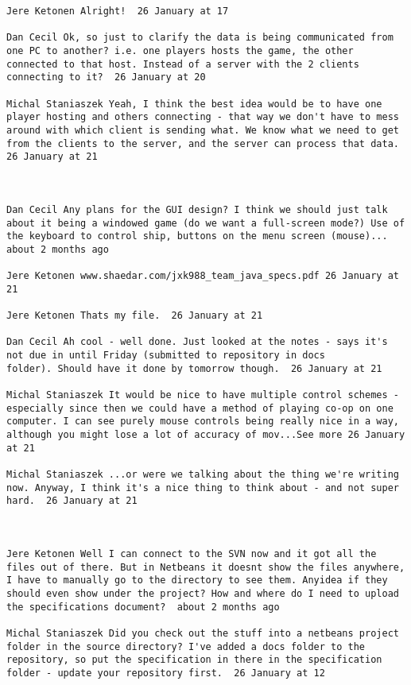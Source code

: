 \begin{verbatim}
Jere Ketonen Alright!  26 January at 17

Dan Cecil Ok, so just to clarify the data is being communicated from
one PC to another? i.e. one players hosts the game, the other
connected to that host. Instead of a server with the 2 clients
connecting to it?  26 January at 20

Michal Staniaszek Yeah, I think the best idea would be to have one
player hosting and others connecting - that way we don't have to mess
around with which client is sending what. We know what we need to get
from the clients to the server, and the server can process that data.
26 January at 21



Dan Cecil Any plans for the GUI design? I think we should just talk
about it being a windowed game (do we want a full-screen mode?) Use of
the keyboard to control ship, buttons on the menu screen (mouse)...
about 2 months ago 

Jere Ketonen www.shaedar.com/jxk988_team_java_specs.pdf 26 January at 21

Jere Ketonen Thats my file.  26 January at 21

Dan Cecil Ah cool - well done. Just looked at the notes - says it's
not due in until Friday (submitted to repository in docs
folder). Should have it done by tomorrow though.  26 January at 21

Michal Staniaszek It would be nice to have multiple control schemes -
especially since then we could have a method of playing co-op on one
computer. I can see purely mouse controls being really nice in a way,
although you might lose a lot of accuracy of mov...See more 26 January
at 21

Michal Staniaszek ‎...or were we talking about the thing we're writing
now. Anyway, I think it's a nice thing to think about - and not super
hard.  26 January at 21



Jere Ketonen Well I can connect to the SVN now and it got all the
files out of there. But in Netbeans it doesnt show the files anywhere,
I have to manually go to the directory to see them. Anyidea if they
should even show under the project? How and where do I need to upload
the specifications document?  about 2 months ago 

Michal Staniaszek Did you check out the stuff into a netbeans project
folder in the source directory? I've added a docs folder to the
repository, so put the specification in there in the specification
folder - update your repository first.  26 January at 12


\end{verbatim}
